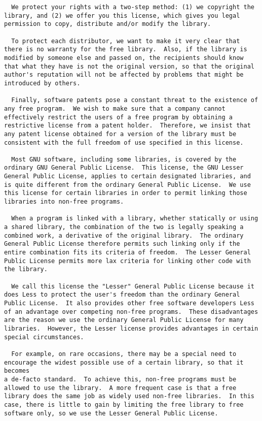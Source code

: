 \documentclass{InsightBook}
\begin{document}
\begin{verbatim}
  We protect your rights with a two-step method: (1) we copyright the
library, and (2) we offer you this license, which gives you legal
permission to copy, distribute and/or modify the library.

  To protect each distributor, we want to make it very clear that
there is no warranty for the free library.  Also, if the library is
modified by someone else and passed on, the recipients should know
that what they have is not the original version, so that the original
author's reputation will not be affected by problems that might be
introduced by others.

  Finally, software patents pose a constant threat to the existence of
any free program.  We wish to make sure that a company cannot
effectively restrict the users of a free program by obtaining a
restrictive license from a patent holder.  Therefore, we insist that
any patent license obtained for a version of the library must be
consistent with the full freedom of use specified in this license.

  Most GNU software, including some libraries, is covered by the
ordinary GNU General Public License.  This license, the GNU Lesser
General Public License, applies to certain designated libraries, and
is quite different from the ordinary General Public License.  We use
this license for certain libraries in order to permit linking those
libraries into non-free programs.

  When a program is linked with a library, whether statically or using
a shared library, the combination of the two is legally speaking a
combined work, a derivative of the original library.  The ordinary
General Public License therefore permits such linking only if the
entire combination fits its criteria of freedom.  The Lesser General
Public License permits more lax criteria for linking other code with
the library.

  We call this license the "Lesser" General Public License because it
does Less to protect the user's freedom than the ordinary General
Public License.  It also provides other free software developers Less
of an advantage over competing non-free programs.  These disadvantages
are the reason we use the ordinary General Public License for many
libraries.  However, the Lesser license provides advantages in certain
special circumstances.

  For example, on rare occasions, there may be a special need to
encourage the widest possible use of a certain library, so that it becomes
a de-facto standard.  To achieve this, non-free programs must be
allowed to use the library.  A more frequent case is that a free
library does the same job as widely used non-free libraries.  In this
case, there is little to gain by limiting the free library to free
software only, so we use the Lesser General Public License.


\end{verbatim}
\end{document}
